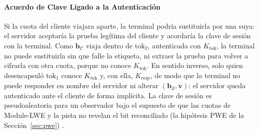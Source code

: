 \paragraph{Acuerdo de Clave Ligado a la Autenticación}
Si la cuota del cliente viajara aparte, la terminal podría sustituirla por una suya: el servidor aceptaría la prueba legítima del cliente y acordaría la clave de sesión con la terminal. Como $\mathbf{b}_{\mathcal{C}}$ viaja dentro de $\text{tok}_2$, autenticada con $K_{\text{tok}}$, la terminal no puede sustituirla sin que falle la etiqueta, ni extraer la prueba para volver a cifrarla con otra cuota, porque no conoce $K_{\text{tok}}$. En sentido inverso, solo quien desencapsuló $\text{tok}_1$ conoce $K_{\text{tok}}$ y, con ella, $K_{\text{resp}}$, de modo que la terminal no puede responder en nombre del servidor ni alterar $(\mathbf{b}_{\mathcal{S}}, \mathbf{v})$: el servidor queda autenticado ante el cliente de forma implícita. La clave de sesión es pseudoaleatoria para un observador bajo el supuesto de que las cuotas de Module-LWE y la pista no revelan el bit reconciliado (la hipótesis PWE de la Sección~\ref{sec:pwe}) \cite{yang2025multiserver}.


